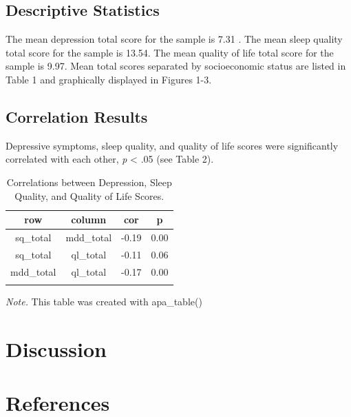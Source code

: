 \documentclass[man]{apa6}
\begin{document}
\subsection{Descriptive Statistics}\label{descriptive-statistics}

The mean depression total score for the sample is 7.31 . The mean sleep
quality total score for the sample is 13.54. The mean quality of life
total score for the sample is 9.97. Mean total scores separated by
socioeconomic status are listed in Table 1 and graphically displayed in
Figures 1-3.

\subsection{Correlation Results}\label{correlation-results}

Depressive symptoms, sleep quality, and quality of life scores were
significantly correlated with each other, \emph{p} \textless{} .05 (see
Table 2).

\begin{table}[tbp]
\begin{center}
\begin{threeparttable}
\caption{\label{tab:correlations table}Correlations between Depression, Sleep Quality, and Quality of Life Scores.}
\begin{tabular}{cccc}
\toprule
row & \multicolumn{1}{c}{column} & \multicolumn{1}{c}{cor} & \multicolumn{1}{c}{p}\\
\midrule
sq\_total & mdd\_total & -0.19 & 0.00\\
sq\_total & ql\_total & -0.11 & 0.06\\
mdd\_total & ql\_total & -0.17 & 0.00\\
\bottomrule
\addlinespace
\end{tabular}
\begin{tablenotes}[para]
\normalsize{\textit{Note.} This table was created with apa\_table()}
\end{tablenotes}
\end{threeparttable}
\end{center}
\end{table}

\section{Discussion}\label{discussion}

\newpage

\section{References}\label{references}
\end{document}
